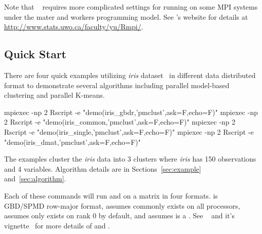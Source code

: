 Note that ~\citep{Yu2010}
requires more complicated settings for running on
some MPI systems under the mater and workers programming model.
See 's website for details at
\url{http://www.stats.uwo.ca/faculty/yu/Rmpi/}.




\subsection[Quick Start]{Quick Start}
\label{sec:quick}

There are four quick examples utilizing {\it iris} dataset~\citep{Fisher1936}
in different data distributed format to demonstrate several algorithms
including parallel model-based clustering and parallel K-means.
\begin{Command}
mpiexec -np 2 Rscript -e "demo(iris_gbdr,'pmclust',ask=F,echo=F)"
mpiexec -np 2 Rscript -e "demo(iris_common,'pmclust',ask=F,echo=F)"
mpiexec -np 2 Rscript -e "demo(iris_single,'pmclust',ask=F,echo=F)"
mpiexec -np 2 Rscript -e "demo(iris_dmat,'pmclust',ask=F,echo=F)"
\end{Command}
The examples cluster the {\it iris} data into 3 clusters where
{\it iris} has 150 observations and 4 variables.
Algorithm details are in Sections~\ref{sec:example} and~\ref{sec:algorithm}.

Each of these commands will run  and  on
a matrix  in four formats.
 is GBD/SPMD row-major format,
 assumes  commonly exists on all processors,
 assumes  only exists on rank 0 by default, and
 assumes  is a .
See ~\citep{Schmidt2013pbdDEMOpackage} and it's
vignette~\citep{Schmidt2013pbdDEMOvignette}
for more details of  and .

